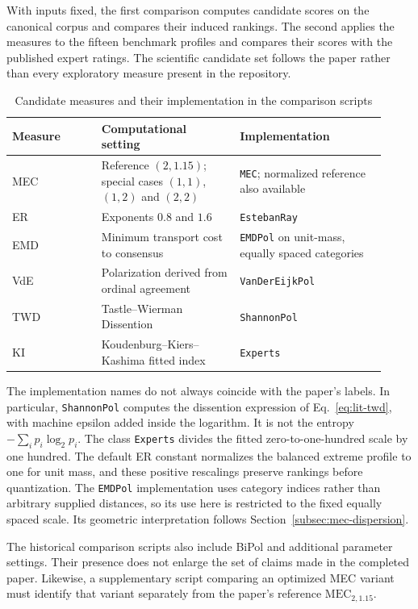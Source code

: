 \documentclass{article}
\theoremstyle{plain}
\theoremstyle{remark}
\begin{document}
With inputs fixed, the first comparison computes candidate scores on the canonical corpus and compares their induced rankings. The second applies the measures to the fifteen benchmark profiles and compares their scores with the published expert ratings. The scientific candidate set follows the paper rather than every exploratory measure present in the repository.

\begin{table}[htbp]
\centering
\caption{Candidate measures and their implementation in the comparison scripts}
\label{tab:methods-candidates}
\small
\begin{tabular}{@{}p{0.22\linewidth}p{0.34\linewidth}p{0.36\linewidth}@{}}
\toprule
Measure & Computational setting & Implementation\\
\midrule
MEC & Reference $(2,1.15)$; special cases $(1,1)$, $(1,2)$ and $(2,2)$ & \texttt{MEC}; normalized reference also available\\
ER & Exponents $0.8$ and $1.6$ & \texttt{EstebanRay}\\
EMD & Minimum transport cost to consensus & \texttt{EMDPol} on unit-mass, equally spaced categories\\
VdE & Polarization derived from ordinal agreement & \texttt{VanDerEijkPol}\\
TWD & Tastle--Wierman Dissention & \texttt{ShannonPol}\\
KI & Koudenburg--Kiers--Kashima fitted index & \texttt{Experts}\\
\bottomrule
\end{tabular}
\end{table}

The implementation names do not always coincide with the paper's labels. In particular, \texttt{ShannonPol} computes the dissention expression of Eq.~\eqref{eq:lit-twd}, with machine epsilon added inside the logarithm. It is not the entropy $-\sum_i p_i\log_2p_i$. The class \texttt{Experts} divides the fitted zero-to-one-hundred scale by one hundred. The default ER constant normalizes the balanced extreme profile to one for unit mass, and these positive rescalings preserve rankings before quantization. The \texttt{EMDPol} implementation uses category indices rather than arbitrary supplied distances, so its use here is restricted to the fixed equally spaced scale. Its geometric interpretation follows Section~\ref{subsec:mec-dispersion}.

The historical comparison scripts also include BiPol and additional parameter settings. Their presence does not enlarge the set of claims made in the completed paper. Likewise, a supplementary script comparing an optimized MEC variant must identify that variant separately from the paper's reference $\mathrm{MEC}_{2,1.15}$.
\end{document}
